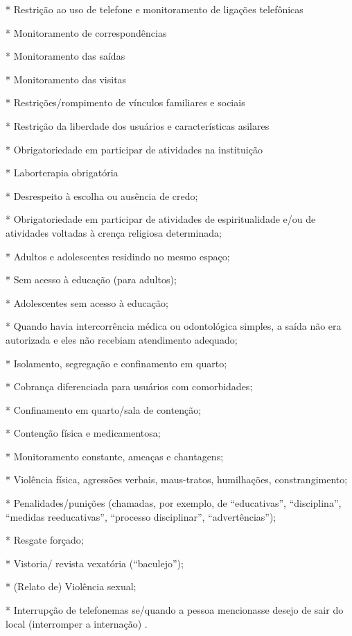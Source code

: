 \documentclass[
	12pt,				%
	oneside,			%
	a4paper,			%
	sumario=tradicional,
	english,			%
	brazil				%
	]{abntex2}
\begin{document}
\begin{quoting}[rightmargin=0cm,leftmargin=4cm]
\begin{singlespace}
{\footnotesize

* Restrição ao uso de telefone e monitoramento de ligações telefônicas

* Monitoramento de correspondências

* Monitoramento das saídas

* Monitoramento das visitas

*   Restrições/rompimento de vínculos familiares e sociais

*   Restrição da liberdade dos usuários e características asilares

*   Obrigatoriedade em participar de atividades na instituição

*   Laborterapia obrigatória

*   Desrespeito à escolha ou ausência de credo;

*   Obrigatoriedade em participar de atividades de espiritualidade e/ou de atividades voltadas à crença religiosa determinada;

*   Adultos e adolescentes residindo no mesmo espaço;

*   Sem acesso à educação (para adultos);

*   Adolescentes sem acesso à educação;

*   Quando havia intercorrência médica ou odontológica simples, a saída não era autorizada e eles não recebiam atendimento adequado;

*   Isolamento, segregação e confinamento em quarto;

*   Cobrança diferenciada para usuários com comorbidades;

*   Confinamento em quarto/sala de contenção;

*   Contenção física e medicamentosa;

*   Monitoramento constante, ameaças e chantagens;

*   Violência física, agressões verbais, maus-tratos, humilhações, constrangimento;

*   Penalidades/punições (chamadas, por exemplo, de “educativas”, “disciplina”, “medidas reeducativas”, “processo disciplinar”, “advertências”);

*   Resgate forçado;

*   Vistoria/ revista vexatória (“baculejo”);

*   (Relato de) Violência sexual;

*   Interrupção de telefonemas se/quando a pessoa mencionasse desejo de sair do local (interromper a internação) \cite[pp. 25-26]{crp2016}.}

\end{singlespace}
\end{quoting}
\end{document}
